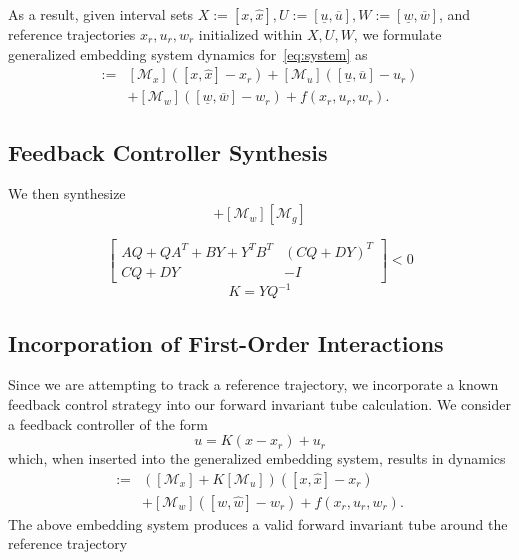 \documentclass[preprint,12pt]{elsarticle}
\newcommand{\ul}{\underline}
\newcommand{\ol}{\overline}
\begin{document}
As a result, given interval sets $X:=[x, \widehat{x}], U:=[\ul{u}, \ol{u}], W:=[\ul{w}, \ol{w}]$, and reference trajectories $x_r, u_r, w_r$ initialized within $X, U, W$, we formulate generalized embedding system dynamics for~\eqref{eq:system} as
\begin{align}
    [\dot{x}, \dot{\widehat{x}}] := &[\mathcal{M}_x]([x, \widehat{x}] - x_r) + [\mathcal{M}_u]([\ul{u}, \ol{u}] - u_r) \\
    &+ [\mathcal{M}_w]([\ul{w}, \ol{w}] - w_r) + f(x_r, u_r, w_r). \nonumber
\end{align}
\subsection{Feedback Controller Synthesis}
We then synthesize 
\begin{equation}
    [\mathcal{M}_x] + [\mathcal{M}_w][\mathcal{M}_g]
\end{equation}

\begin{equation}
    \begin{bmatrix}
        AQ+QA^T+BY+Y^TB^T & (CQ+DY)^T\\
        CQ+DY & -I
    \end{bmatrix} < 0
\end{equation}
\begin{equation}
    K = YQ^{-1}
\end{equation}
\subsection{Incorporation of First-Order Interactions}
Since we are attempting to track a reference trajectory, we incorporate a known feedback control strategy into our forward invariant tube calculation. We consider a feedback controller of the form 
\begin{equation}
\label{eq:feedback_controller}
    u = K(x - x_r) + u_r
\end{equation}
which, when inserted into the generalized embedding system, results in dynamics
\begin{align}
    [\dot{x}, \dot{\widehat{x}}] := &([\mathcal{M}_x] + K[\mathcal{M}_u])([x, \widehat{x}] - x_r) \label{eq:gen_emb}\\
    &+ [\mathcal{M}_w]([w, \widehat{w}] - w_r) + f(x_r, u_r, w_r).\nonumber
\end{align}
The above embedding system produces a valid forward invariant tube around the reference trajectory %
\end{document}
